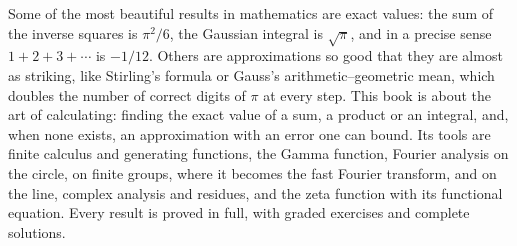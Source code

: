 Some of the most beautiful results in mathematics are exact values: the sum of the inverse squares is $\pi^2/6$, the
Gaussian integral is $\sqrt\pi$, and in a precise sense $1+2+3+\cdots$ is $-1/12$. Others are approximations so good that
they are almost as striking, like Stirling's formula or Gauss's arithmetic--geometric mean, which doubles the number of
correct digits of $\pi$ at every step. This book is about the art of calculating: finding the exact value of a sum, a
product or an integral, and, when none exists, an approximation with an error one can bound. Its tools are finite
calculus and generating functions, the Gamma function, Fourier analysis on the circle, on finite groups, where it
becomes the fast Fourier transform, and on the line, complex analysis and residues, and the zeta function with its
functional equation. Every result is proved in full, with graded exercises and complete solutions.
